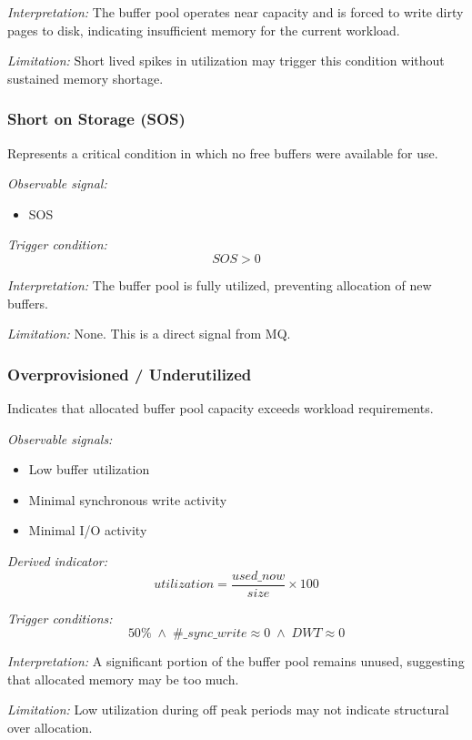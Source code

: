 \textit{Interpretation:}  
The buffer pool operates near capacity and is forced to write dirty pages to disk, indicating insufficient memory for the current workload.

\textit{Limitation:}  
Short lived spikes in utilization may trigger this condition without sustained memory shortage.


\subsubsection{Short on Storage (SOS)}

Represents a critical condition in which no free buffers were available for use.

\textit{Observable signal:}
\begin{itemize}
    \item SOS
\end{itemize}

\textit{Trigger condition:}
\[
SOS > 0
\]

\textit{Interpretation:}  
The buffer pool is fully utilized, preventing allocation of new buffers.

\textit{Limitation:}  
None. This is a direct signal from MQ.



\subsubsection{Overprovisioned / Underutilized}

Indicates that allocated buffer pool capacity exceeds workload requirements.

\textit{Observable signals:}
\begin{itemize}
    \item Low buffer utilization
    \item Minimal synchronous write activity
    \item Minimal I/O activity
\end{itemize}

\textit{Derived indicator:}
\[
utilization = \frac{used\_now}{size} \times 100
\]

\textit{Trigger conditions:}
\[
 50\% \;\land\; \#\_sync\_write \approx 0 \;\land\; DWT \approx 0
\]

\textit{Interpretation:}  
A significant portion of the buffer pool remains unused, suggesting that allocated memory may be too much.

\textit{Limitation:}  
Low utilization during off peak periods may not indicate structural over allocation.


